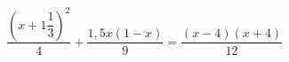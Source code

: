 \begin{ex}[type=equation]
	\begin{condition}
		$\dfrac{\left(x + 1\dfrac{1}{3}\right)^2}{4}+ \dfrac{1,5x(1 - x)}{9} = \dfrac{(x - 4)(x + 4)}{12}$
	\end{condition}
\end{ex}